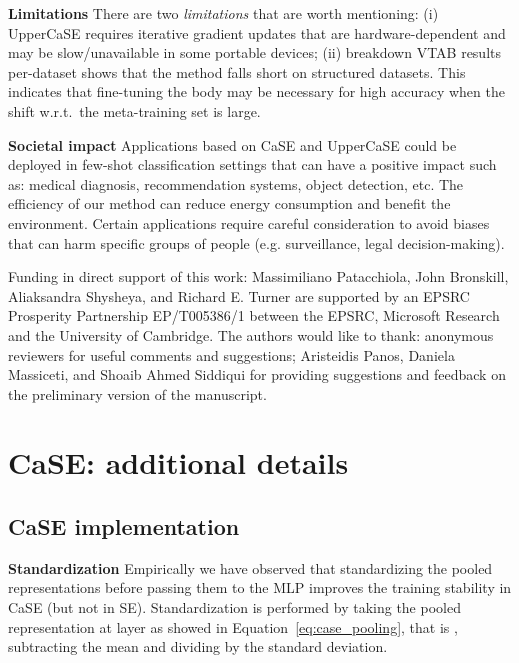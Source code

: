 \documentclass{article}
\begin{document}
\textbf{Limitations} There are two \emph{limitations} that are worth mentioning: (i) UpperCaSE requires iterative gradient updates that are hardware-dependent and may be slow/unavailable in some portable devices; (ii) breakdown VTAB results per-dataset shows that the method falls short on structured datasets. This indicates that fine-tuning the body may be necessary for high accuracy when the shift w.r.t.~the meta-training set is large.

\textbf{Societal impact} Applications based on CaSE and UpperCaSE could be deployed in few-shot classification settings that can have a positive impact such as: medical diagnosis, recommendation systems, object detection, etc. The efficiency of our method can reduce energy consumption and benefit the environment. Certain applications require careful consideration to avoid biases that can harm specific groups of people (e.g. surveillance, legal decision-making).

\begin{ack}
Funding in direct support of this work: 
Massimiliano Patacchiola, John Bronskill, Aliaksandra Shysheya, and Richard E. Turner are supported by an EPSRC Prosperity Partnership EP/T005386/1 between the EPSRC,
Microsoft Research and the University of Cambridge. The authors would like to thank: anonymous reviewers for useful comments and suggestions; Aristeidis Panos, Daniela Massiceti, and Shoaib Ahmed Siddiqui for providing suggestions and feedback on the preliminary version of the manuscript.
\end{ack}











\clearpage
\appendix

\section{CaSE: additional details} \label{appendix:sec_case_details}

\subsection{CaSE implementation} \label{appendix:ssec_techincal_details_case}

\textbf{Standardization} Empirically we have observed that standardizing the pooled representations before passing them to the MLP improves the training stability in CaSE (but not in SE). Standardization is performed by taking the pooled representation at layer  as showed in Equation~\eqref{eq:case_pooling}, that is , subtracting the mean and dividing by the standard deviation. 
\end{document}
